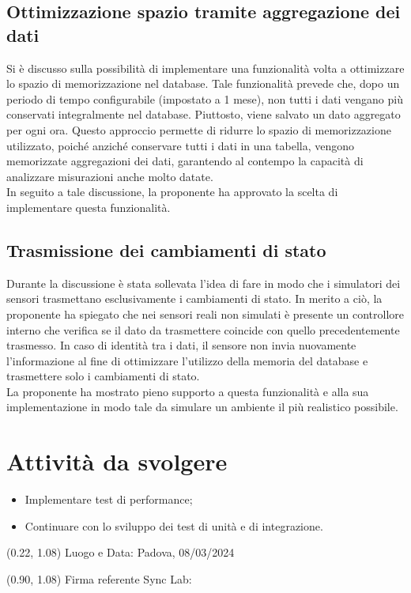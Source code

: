 \documentclass{article}
\begin{document}
    \subsection{Ottimizzazione spazio tramite aggregazione dei dati}
        Si è discusso sulla possibilità di implementare una funzionalità volta a ottimizzare lo spazio di memorizzazione nel database. Tale funzionalità prevede che, dopo un periodo di tempo configurabile (impostato a 1 mese), non tutti i dati vengano più conservati integralmente nel database. Piuttosto, viene salvato un dato aggregato per ogni ora. Questo approccio permette di ridurre lo spazio di memorizzazione utilizzato, poiché anziché conservare tutti i dati in una tabella, vengono memorizzate aggregazioni dei dati, garantendo al contempo la capacità di analizzare misurazioni anche molto datate. \\
        In seguito a tale discussione, la proponente ha approvato la scelta di implementare questa funzionalità.

    \subsection{Trasmissione dei cambiamenti di stato}
        Durante la discussione è stata sollevata l'idea di fare in modo che i simulatori dei sensori trasmettano esclusivamente i cambiamenti di stato. In merito a ciò, la proponente ha spiegato che nei sensori reali non simulati è presente un controllore interno che verifica se il dato da trasmettere coincide con quello precedentemente trasmesso. In caso di identità tra i dati, il sensore non invia nuovamente l'informazione al fine di ottimizzare l'utilizzo della memoria del database e trasmettere solo i cambiamenti di stato. \\
        La proponente ha mostrato pieno supporto a questa funzionalità e alla sua implementazione in modo tale da simulare un ambiente il più realistico possibile.

        

\section{Attività da svolgere} 
    \begin{itemize}
        \item Implementare test di performance;
        \item Continuare con lo sviluppo dei test di unità e di integrazione.
\end{itemize}
\begin{textblock*}{\textwidth}(0.22\textwidth, 1.08\textheight)
    Luogo e Data: Padova, 08/03/2024
\end{textblock*}

\begin{textblock*}{\textwidth}(0.90\textwidth, 1.08\textheight)
        Firma referente Sync Lab:
\end{textblock*}
\end{document}
